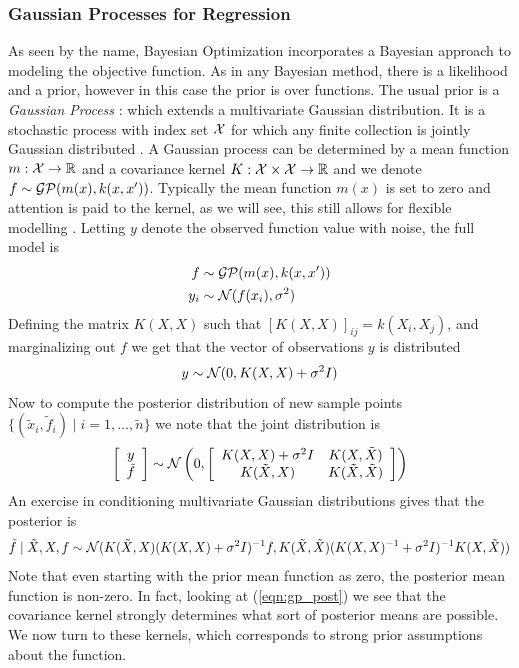 \documentclass[11pt]{article}
\begin{document}
\subsubsection{Gaussian Processes for Regression}
As seen by the name, Bayesian Optimization incorporates a Bayesian approach to modeling the objective function. As in any Bayesian method, there is a likelihood and a prior, however in this case the prior is over functions. The usual prior is a {\it Gaussian Process} \cite{Brochu2010, Snoek2012}: which extends a multivariate Gaussian distribution. It is a stochastic process with index set $\mathcal{X}$ for which any finite collection is jointly Gaussian distributed \cite{Rasmussen2004}. A Gaussian process can be determined  by a mean function $m:\mathcal{X} \to \mathbb{R}$ and a covariance kernel $K:\mathcal{X} \times \mathcal{X} \to \mathbb{R}$ and we denote $f \sim \mathcal{GP}(m(x), k(x,x'))$. Typically the mean function $m(x)$ is set to zero and attention is paid to the kernel, as we will see, this still allows for flexible modelling \cite{Snoek2012}. Letting $y$ denote the observed function value with noise, the full model is 
\begin{equation}
\begin{split}
f & \sim \mathcal{GP}(m(x), k(x,x'))\\
y_i & \sim \mathcal{N}(f(x_i), \sigma^2)
\end{split}
\end{equation}
Defining the matrix $K(X,X)$ such that $[K(X,X)]_{ij} = k(X_i, X_j)$, and marginalizing out $f$ we get that the vector of observations $y$ is distributed
\begin{equation}
\label{eqn:gp_marg}
y \sim \mathcal{N}(0, K(X,X) + \sigma^2 I)
\end{equation}
Now to compute the posterior distribution of new sample points $\{(\tilde{x}_i, \tilde{f}_i)\mid i=1,\ldots,\tilde{n}\}$ we note that the joint distribution is 
\begin{equation}
\left [ \begin{array}{c}
y\\
\tilde{f}
\end{array} 
\right]
\sim \mathcal{N} \left(0, 
\left [
\begin{array}{c c}
K(X,X) + \sigma^2 I & K(X, \tilde{X})\\
K(\tilde{X}, X) & K(\tilde{X}, \tilde{X})
\end{array}
\right] \right)
\end{equation}
An exercise in conditioning multivariate Gaussian distributions gives that the posterior is
\begin{equation}
\label{eqn:gp_post}
\tilde{f} \mid \tilde{X}, X, f \sim \mathcal{N}(K(\tilde{X},X)(K(X,X) + \sigma^2I)^{-1}f, K(\tilde{X}, \tilde{X})(K(X,X)^{-1} + \sigma^2 I)^{-1}K(X, \tilde{X}))
\end{equation}
Note that even starting with the prior mean function as zero, the posterior mean function is non-zero. In fact, looking at (\ref{eqn:gp_post}) we see that the covariance kernel strongly determines what sort of posterior means are possible. We now turn to these kernels, which corresponds to strong prior assumptions about the function. 
\end{document}
